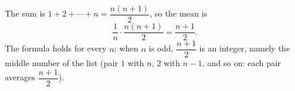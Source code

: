 The sum is $1+2+\cdots+n=\dfrac{n(n+1)}{2}$, so the mean is
\[
\dfrac{1}{n}\cdot\dfrac{n(n+1)}{2}=\boxed{\dfrac{n+1}{2}} .
\]
The formula holds for every $n$; when $n$ is odd, $\dfrac{n+1}{2}$ is an integer, namely the middle number of the list (pair $1$ with $n$, $2$ with $n-1$, and so on: each pair averages $\dfrac{n+1}{2}$).
